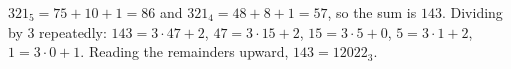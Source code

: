 $321_5=75+10+1=86$ and $321_4=48+8+1=57$, so the sum is $143$. Dividing by $3$ repeatedly: $143=3\cdot47+2$, $47=3\cdot15+2$, $15=3\cdot5+0$, $5=3\cdot1+2$, $1=3\cdot0+1$. Reading the remainders upward, $143=\boxed{12022_3}$.
